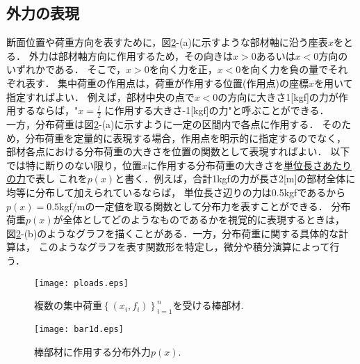 \documentclass[10pt,a4j]{jbook}
\begin{document}
\subsection{外力の表現}
\hspace{\parindent}
断面位置や荷重方向を表すために，図\ref{fig:fig0}-(a)に示すような部材軸に沿う座表$x$をとる．
外力は部材軸方向に作用するため，その向きは$x>0$あるいは$x<0$方向のいずれかである．
そこで，$x>0$を向く力を正，$x<0$を向く力を負の量でそれぞれ表す．
集中荷重の作用点は，荷重が作用する位置(作用点)の座標$x$を用いて指定すればよい．
例えば，部材中央の点で$x<0$の方向に大きさ1[kgf]の力が作用するならば，"$x=\frac{l}{2}$
に作用する大きさ-1[kgf]の力"と呼ぶことができる．\\
一方，分布荷重は図\ref{fig:fig0}-(a)に示すように一定の区間内で各点に作用する．
そのため，分布荷重を定量的に表現する場合，作用点を明示的に指定するのでなく，
部材各点における分布荷重の大きさを位置の関数として表現すればよい．
以下では特に断りのない限り，位置$x$に作用する分布荷重の大きさを\underline{単位長さあたりの力}で表し
これを$p(x)$と書く．例えば，合計1kgfの力が長さ2[m]の部材全体に均等に分布して加えられているならば，
単位長さ辺りの力は0.5kgfであるから$p(x)=0.5$kgf/mの一定値を取る関数として分布力を表すことができる．
分布荷重$p(x)$が全体としてどのようなものであるかを視覚的に表現するときは，
図\ref{fig:fig0}-(b)のようなグラフを描くことがある．一方，分布荷重に関する具体的な計算は，
このようなグラフを表す関数形を特定し，微分や積分演算によって行う．
\begin{figure}[h]
	\begin{center}
	\texttt{[image: ploads.eps]} 
	\end{center}
	\caption{複数の集中荷重$\left\{(x_i,f_i)\right\}_{i=1}^n$を受ける棒部材.} 
	\label{fig:ploads}
\end{figure}
\begin{figure}[h]
	\begin{center}
	\texttt{[image: bar1d.eps]} 
	\end{center}
	\caption{棒部材に作用する分布外力$p(x)$.} 
	\label{fig:fig0}
\end{figure}
\end{document}
